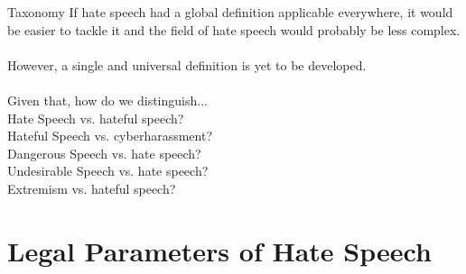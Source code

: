 \documentclass[nobackground,dvipsnames,table,aspectratio=169]{beamer}
\begin{document}
\begin{frame}{Taxonomy}
    If hate speech had a global definition applicable everywhere, it would be easier to tackle it and the field of hate speech would probably be less complex.\\~\\

    However, a single and universal definition is yet to be developed.\\~\\

    Given that, how do we distinguish...\\
    Hate Speech vs. hateful speech?\\
    Hateful Speech vs. cyberharassment?\\
    Dangerous Speech vs. hate speech?\\
    Undesirable Speech vs. hate speech?\\
    Extremism vs. hateful speech?
\end{frame}

\section{Legal Parameters of Hate Speech}

\begin{frame}{}
    \thispagestyle{empty}
\end{frame}

\begin{frame}{}
    \thispagestyle{empty}
\end{frame}
\end{document}
